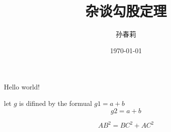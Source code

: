 \documentclass[UTF8]{article}  %
\title{\heiti 杂谈勾股定理}
\author{\kaishu 孙春莉}
\date{\today}
\begin{document}
	\maketitle %
	Hello world!
	
	let $g$ is difined by the formual  $ g1= a+ b $%
	$$ g2= a+b$$ %
	
	\begin{equation}
		AB^2 = BC^2 + AC^2
	\end{equation}
	
	
\end{document}

